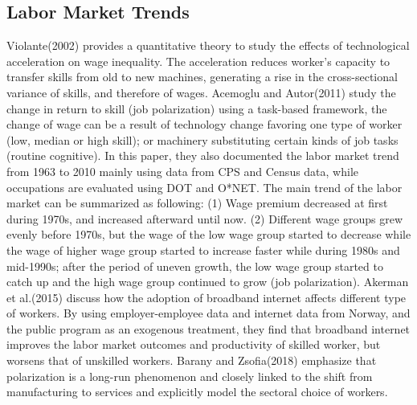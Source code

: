 \documentclass{article}
\newcommand{\1}{\mathbb{1}}
\begin{document}
\subsection{Labor Market Trends}
Violante(2002)\cite{Violante2002} provides a quantitative theory to study the effects of technological acceleration on wage inequality. The acceleration reduces worker's capacity to transfer skills from old to new machines, generating a rise in the cross-sectional variance of skills, and therefore of wages.
Acemoglu and Autor(2011)\cite{AcemogluAutor2011} study the change in return to skill (job polarization) using a task-based framework, the change of wage can be a result of technology change favoring one type of worker (low, median or high skill); or machinery substituting certain kinds of job tasks (routine cognitive). In this paper, they also documented the labor market trend from 1963 to 2010 mainly using data from CPS and Census data, while occupations are evaluated using DOT and O*NET. The main trend of the labor market can be summarized as following: (1) Wage premium decreased at first during 1970s, and increased afterward until now. (2) Different wage groups grew evenly before 1970s, but the wage of the low wage group started to decrease while the wage of higher wage group started to increase faster while during 1980s and mid-1990s; after the period of uneven growth, the low wage group started to catch up and the high wage group continued to grow (job polarization). 
Akerman et al.(2015)\cite{Akermanetal2015} discuss how the adoption of broadband internet affects different type of workers. By using employer-employee data and internet data from Norway, and the public program as an exogenous treatment, they find that broadband internet improves the labor market outcomes and productivity of skilled worker, but worsens that of unskilled workers. 
Barany and Zsofia(2018)\cite{BaranyZsofia2018} emphasize that polarization is a long-run phenomenon and closely linked to the shift from manufacturing to services and explicitly model the sectoral choice of workers.
\end{document}
